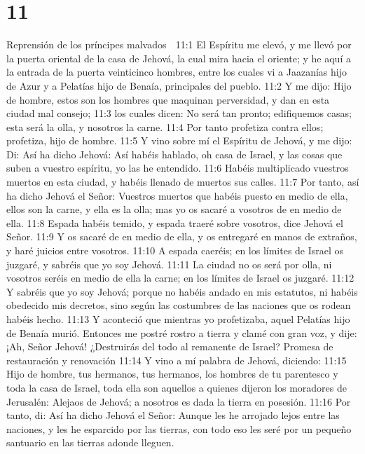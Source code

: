 \chapter{11}

Reprensión de los príncipes malvados  

11:1 El Espíritu me elevó, y me llevó por la puerta oriental de la casa de Jehová, la cual mira hacia el oriente; y he aquí a la entrada de la puerta veinticinco hombres, entre los cuales vi a Jaazanías hijo de Azur y a Pelatías hijo de Benaía, principales del pueblo.  
11:2 Y me dijo: Hijo de hombre, estos son los hombres que maquinan perversidad, y dan en esta ciudad mal consejo;  
11:3 los cuales dicen: No será tan pronto; edifiquemos casas; esta será la olla, y nosotros la carne.  
11:4 Por tanto profetiza contra ellos; profetiza, hijo de hombre.  
11:5 Y vino sobre mí el Espíritu de Jehová, y me dijo: Di: Así ha dicho Jehová: Así habéis hablado, oh casa de Israel, y las cosas que suben a vuestro espíritu, yo las he entendido.  
11:6 Habéis multiplicado vuestros muertos en esta ciudad, y habéis llenado de muertos sus calles.  
11:7 Por tanto, así ha dicho Jehová el Señor: Vuestros muertos que habéis puesto en medio de ella, ellos son la carne, y ella es la olla; mas yo os sacaré a vosotros de en medio de ella.  
11:8 Espada habéis temido, y espada traeré sobre vosotros, dice Jehová el Señor.  
11:9 Y os sacaré de en medio de ella, y os entregaré en manos de extraños, y haré juicios entre vosotros.  
11:10 A espada caeréis; en los límites de Israel os juzgaré, y sabréis que yo soy Jehová.  
11:11 La ciudad no os será por olla, ni vosotros seréis en medio de ella la carne; en los límites de Israel os juzgaré.  
11:12 Y sabréis que yo soy Jehová; porque no habéis andado en mis estatutos, ni habéis obedecido mis decretos, sino según las costumbres de las naciones que os rodean habéis hecho.  
11:13 Y aconteció que mientras yo profetizaba, aquel Pelatías hijo de Benaía murió. Entonces me postré rostro a tierra y clamé con gran voz, y dije: ¡Ah, Señor Jehová! ¿Destruirás del todo al remanente de Israel?  
Promesa de restauración y renovación  
11:14 Y vino a mí palabra de Jehová, diciendo:  
11:15 Hijo de hombre, tus hermanos, tus hermanos, los hombres de tu parentesco y toda la casa de Israel, toda ella son aquellos a quienes dijeron los moradores de Jerusalén: Alejaos de Jehová; a nosotros es dada la tierra en posesión.  
11:16 Por tanto, di: Así ha dicho Jehová el Señor: Aunque les he arrojado lejos entre las naciones, y les he esparcido por las tierras, con todo eso les seré por un pequeño santuario en las tierras adonde lleguen.  
